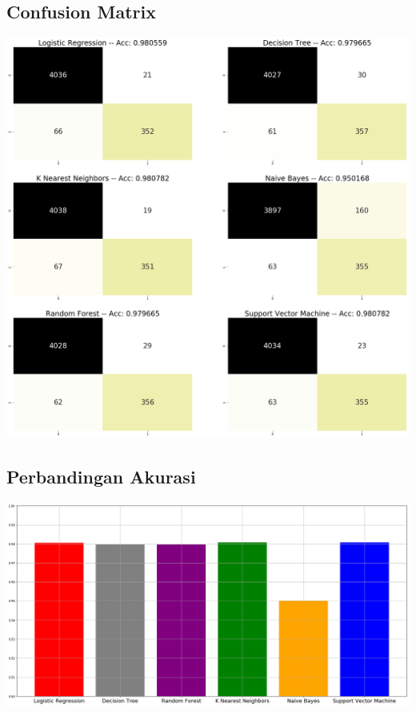 \documentclass[12pt]{article}
\begin{document}
    \subsection{Confusion Matrix}
    \newline 
    \newline \includegraphics[scale=0.285]{confusion-matrix.png}
    
    \newpage
    
    \subsection{Perbandingan Akurasi}
    \newline 
    \newline \includegraphics[scale=0.25]{bar-chart-comparison.png}
\end{document}
